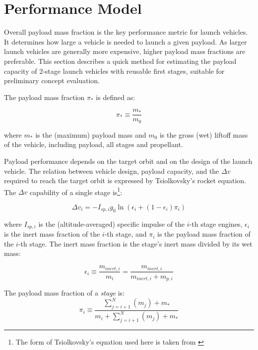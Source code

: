 \documentclass[conf]{new-aiaa}
\begin{document}
\section{Performance Model}

Overall payload mass fraction is the key performance metric for launch vehicles. It determines how large a vehicle is needed to launch a given payload. As larger launch vehicles are generally more expensive, higher payload mass fractions are preferable. This section describes a quick method for estimating the payload capacity of 2-stage launch vehicles with reusable first stages, suitable for preliminary concept evaluation.

The payload mass fraction $\pi_*$ is defined as:

\begin{equation}
\pi_* \equiv \frac{m_*}{m_0}
\end{equation}

where $m_*$ is the (maximum) payload mass and $m_0$ is the gross (wet) liftoff mass of the vehicle, including payload, all stages and propellant.

Payload performance depends on the target orbit and on the design of the launch vehicle. The relation between vehicle design, payload capacity, and the $\Delta v$ required to reach the target orbit is expressed by Tsiolkovsky’s rocket equation. The $\Delta v$ capability of a single stage is\footnote{The form of Tsiolkovsky's equation used here is taken from \cite{Wiesel2010}}:

\begin{equation}
\Delta v_i = - I_{sp,i} g_0 \ln \left( \epsilon_i + (1 - \epsilon_i) \pi_i \right)
\end{equation}

where $I_{sp,i}$ is the (altitude-averaged) specific impulse of the $i$-th stage engines, $\epsilon_i$ is the inert mass fraction of the $i$-th stage, and $\pi_i$ is the payload mass fraction of the $i$-th stage. The inert mass fraction is the stage's inert mass divided by its wet mass:

\begin{equation}
\epsilon_i \equiv \frac{m_{inert,i}}{m_i} = \frac{m_{inert,i}}{m_{inert,i} + m_{p,i}}
\end{equation}

The payload mass fraction of a \emph{stage} is:
\begin{equation}
\pi_i \equiv \frac{\sum_{j=i+1}^N (m_j) + m_*}{m_i + \sum_{j=i+1}^N (m_j) + m_*}
\end{equation}
\end{document}
